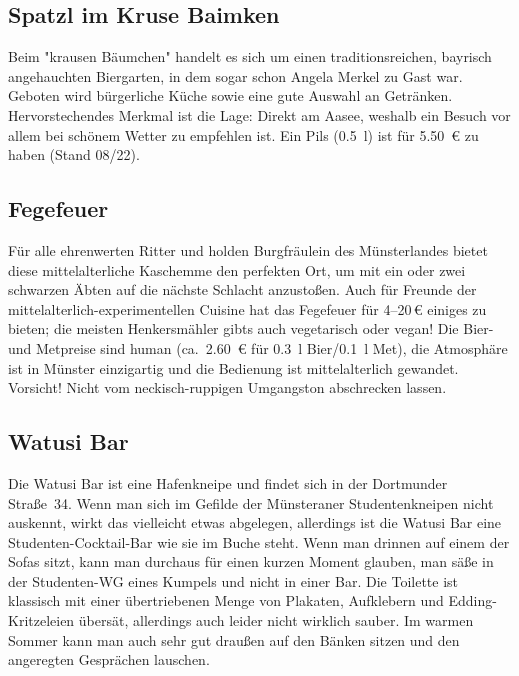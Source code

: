 {\begin{multicols*}{2}
\subsection{Spatzl im Kruse Baimken}
Beim "krausen Bäumchen" handelt es sich um einen traditionsreichen, bayrisch angehauchten Biergarten, in dem sogar schon Angela Merkel zu Gast war.
Geboten wird bürgerliche Küche sowie eine gute Auswahl an Getränken.
Hervorstechendes Merkmal ist die Lage: Direkt am Aasee, weshalb ein Besuch vor allem bei schönem Wetter zu empfehlen ist.
Ein Pils (\SI{0,5}{\l}) ist für \SI{5,50}{\euro} zu haben (Stand 08/22).

\begin{center}
\end{center}

\subsection{Fegefeuer}
Für alle ehrenwerten Ritter und holden Burgfräulein des Münsterlandes bietet diese mittelalterliche Kaschemme den perfekten Ort, um mit ein oder zwei schwarzen Äbten auf die nächste Schlacht anzustoßen.
Auch für Freunde der mittelalterlich-experimentellen Cuisine hat das Fegefeuer für 4--20\,€ einiges zu bieten; die meisten Henkersmähler gibts auch vegetarisch oder vegan! Die Bier- und Metpreise sind human (ca.\ \SI{2,60}{\euro} für \SI{0,3}{\l} Bier/\SI{0,1}{\l} Met), die Atmosphäre ist in Münster einzigartig und die Bedienung ist mittelalterlich gewandet.
Vorsicht! Nicht vom neckisch-ruppigen Umgangston abschrecken lassen.

\begin{center}
\end{center}

\subsection{Watusi Bar} %
Die Watusi Bar ist eine Hafenkneipe und findet sich in der Dortmunder Straße~34.
Wenn man sich im Gefilde der Münsteraner Studentenkneipen nicht auskennt, wirkt das vielleicht etwas abgelegen, allerdings ist die Watusi Bar eine Studenten-Cocktail-Bar wie sie im Buche steht.
Wenn man drinnen auf einem der Sofas sitzt, kann man durchaus für einen kurzen Moment glauben, man säße in der Studenten-WG eines Kumpels und nicht in einer Bar.
Die Toilette ist klassisch mit einer übertriebenen Menge von Plakaten, Aufklebern und Edding-Kritzeleien übersät, allerdings auch leider nicht wirklich sauber.
Im warmen Sommer kann man auch sehr gut draußen auf den Bänken sitzen und den angeregten Gesprächen lauschen.


\end{multicols*}}
